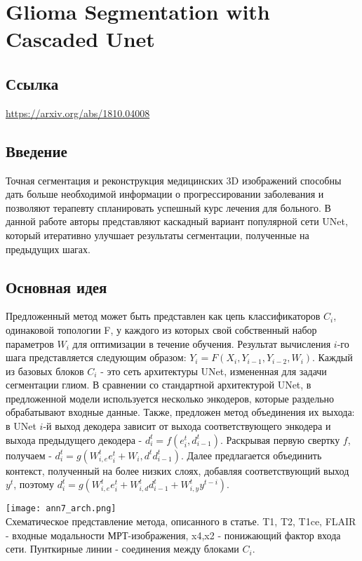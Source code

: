 \section{Glioma Segmentation with Cascaded Unet}

\subsection*{Ссылка} \url{https://arxiv.org/abs/1810.04008}
\subsection*{Введение}
Точная сегментация и реконструкция медицинских 3D изображений способны дать 
больше необходимой информации о прогрессировании заболевания и позволяют терапевту 
спланировать успешный курс лечения для больного. В данной работе авторы представляют
каскадный вариант популярной сети UNet, который итеративно улучшает результаты сегментации, 
полученные на предыдущих шагах. 
\subsection*{Основная идея}
Предложенный метод может быть представлен как цепь классификаторов 
\(C_i\), одинаковой топологии F, у каждого из которых свой собственный 
набор параметров \(W_i\) для оптимизации в течение обучения.
Результат вычисления \(i\)-го шага представляется следующим образом: 
\(Y_i=F(X_i,Y_{i-1}, Y_{i-2}, W_i)\). Каждый из базовых блоков \(C_i\) - это
сеть архитектуры UNet, измененная для задачи сегментации глиом. В сравнении 
со стандартной архитектурой UNet, в предложенной модели используется несколько 
энкодеров, которые раздельно обрабатывают входные данные. Также, предложен метод объединения 
их выхода: в UNet \(i\)-й выход декодера зависит от выхода соответствующего 
энкодера и выхода предыдущего декодера - \(d_i^{t}=f(e_i^{t}, d^{t}_{i-1})\). 
Раскрывая первую свертку \(f\), получаем - \(d_i^{t}=g(W_{i,e}^{t}e_i^{t}+W_{i},d^{t}d^{t}_{i-1})\).
Далее предлагается объединить контекст, полученный на более низких слоях, 
добавляя соответствующий выход \(y^t\), поэтому \(d_i^{t}=g(W_{i,e}^{t}e_i^{t}+W_{i,d}^{t}d^{t}_{i-1}+W_{i,y}^{t}y^{t-i})\).
\\
\begin{minipage}{1.0\linewidth}
    \begin{center}
        \texttt{[image: ann7\_arch.png]} \\
        \caption{\scriptsize{Схематическое представление метода, описанного в статье.
        T1, T2, T1ce, FLAIR - входные модальности МРТ-изображения, x4,x2 - понижающий
        фактор входа сети. Пунткирные линии - соединения между блоками \(C_i\).}}
    \end{center}
\end{minipage}


